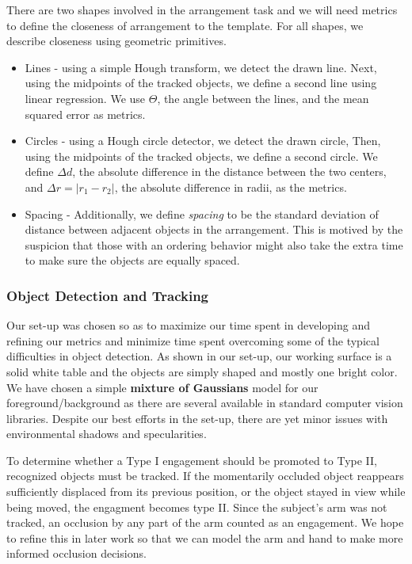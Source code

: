 \documentclass[11pt]{article}
\begin{document}
There are two shapes involved in the arrangement task and we will need metrics to define the closeness of arrangement to the template. For all shapes, we describe closeness using geometric primitives.
\begin{itemize}
	\item{Lines - using a simple Hough transform, we detect the drawn line. Next, using the midpoints of the tracked objects, we define a second line using linear regression. We use $\Theta$, the angle between the lines, and the mean squared error as metrics.\\
}
	\item{Circles - using a Hough circle detector, we detect the drawn circle, Then, using the midpoints of the tracked objects, we define a second circle. We define $\Delta d$, the absolute difference in the distance between the two centers, and $\Delta r = | r_{1} - r_{2} |$, the absolute difference in radii, as the metrics.
}
	\item{Spacing - Additionally, we define {\it spacing} to be the standard deviation of distance between adjacent objects in the arrangement. This is motived by the suspicion that those with an ordering behavior might also take the extra time to make sure the objects are equally spaced.}
\end{itemize}

\subsubsection{Object Detection and Tracking}
Our set-up was chosen so as to maximize our time spent in developing and refining our metrics and minimize time spent overcoming some of the typical difficulties in object detection. As shown in our set-up, our working surface is a solid white table and the objects are simply shaped and mostly one bright color. We have chosen a simple \textbf{mixture of Gaussians} model for our foreground/background as there are several available in standard computer vision libraries. Despite our best efforts in the set-up, there are yet minor issues with environmental shadows and specularities.

To determine whether a Type I engagement should be promoted to Type II, recognized objects must be tracked. If the momentarily occluded object reappears sufficiently displaced from its previous position, or the object stayed in view while being moved, the engagment becomes type II. Since the subject's arm was not tracked, an occlusion by any part of the arm counted as an engagement. We hope to refine this in later work so that we can model the arm and hand to make more informed occlusion decisions.
\end{document}

